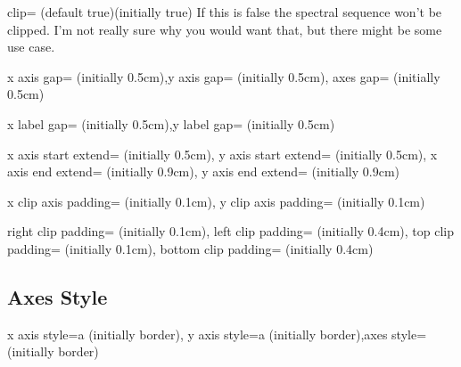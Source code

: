 \documentclass{ltxdoc}
\begin{document}
\begin{sseqdata}[name=ex1,degree={#1}{1-#1}]
\begin{key}{clip= (default true)(initially true)}
If this is false the spectral sequence won't be clipped. I'm not really sure why you would want that, but there might be some use case.
\end{key}

\begin{keylist}{x axis gap= (initially 0.5cm),y axis gap= (initially 0.5cm), axes gap= (initially 0.5cm)}

\end{keylist}


\begin{keylist}{x label gap= (initially 0.5cm),y label gap= (initially 0.5cm)}

\end{keylist}

\begin{keylist}{x axis start extend= (initially 0.5cm), y axis start extend= (initially 0.5cm),
                x axis end extend= (initially 0.9cm), y axis end extend= (initially 0.9cm)}

\end{keylist}

\begin{keylist}{x clip axis padding= (initially 0.1cm), y clip axis padding= (initially 0.1cm)}

\end{keylist}

\begin{keylist}{right clip padding= (initially 0.1cm), left clip padding= (initially 0.4cm),
                top clip padding= (initially 0.1cm), bottom clip padding= (initially 0.4cm)}

\end{keylist}


\subsection{Axes Style}

\begin{keylist}{x axis style=a (initially border), y axis style=a (initially border),axes style= (initially border)}

\end{keylist}


\end{sseqdata}
\end{document}
